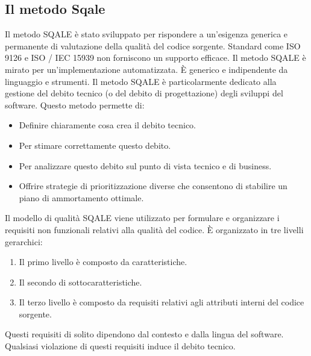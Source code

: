 \subsection{Il metodo Sqale}
Il metodo SQALE è stato sviluppato per rispondere a un'esigenza generica e permanente di valutazione della qualità del codice sorgente. Standard come ISO 9126 e ISO / IEC 15939 non forniscono un supporto efficace. Il metodo SQALE è mirato per un'implementazione automatizzata. È generico e indipendente da linguaggio e strumenti.  Il metodo SQALE è particolarmente dedicato alla gestione del debito tecnico (o del debito di progettazione) degli sviluppi del software. Questo metodo permette di:
\begin{itemize}
\item Definire chiaramente cosa crea il debito tecnico.
\item Per stimare correttamente questo debito.
\item Per analizzare questo debito sul punto di vista tecnico e di business.
\item Offrire strategie di prioritizzazione diverse che consentono di stabilire un piano di ammortamento ottimale. 
\end{itemize}
Il modello di qualità SQALE viene utilizzato per formulare e organizzare i requisiti non funzionali relativi alla qualità del codice. È organizzato in tre livelli gerarchici:
\begin{enumerate}
\item Il primo livello è composto da caratteristiche.
\item Il secondo di sottocaratteristiche.
\item Il terzo livello è composto da requisiti relativi agli attributi interni del codice sorgente.
\end{enumerate}
Questi requisiti di solito dipendono dal contesto e dalla lingua del software. Qualsiasi violazione di questi requisiti induce il debito tecnico.